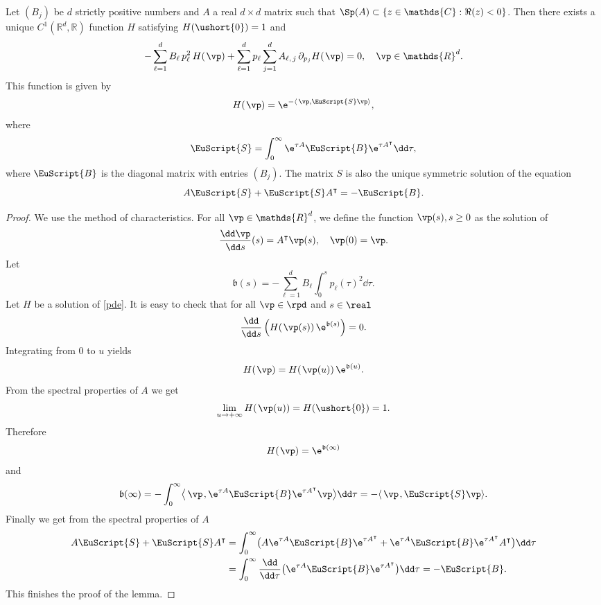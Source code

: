 \begin{lemma}\label{uniquesol}
Let $(B_{j})$ be $d$ strictly positive numbers and $A$ a real $d\times
d$ matrix
such that $\Sp(A)\subset\{z\in\mathds{C}: \Re(z)<0\}$. Then
there exists a unique $C^{1}(\mathds{R}^d,\mathds{R})$ function $H$ satisfying
$H(\ushort{0})=1$ and
\begin{equation}
\label{pde}
-\sum_{\ell=1}^{d}B_{\ell}\, p_{\ell}^2\,H(\hspace{1pt}\vp)+\sum_{\ell=1}^{d} p_{\ell}\sum_{j=1}^{d}A_{\ell,\,j}\,\partial_{p_{j}}H(\hspace{1pt}\vp)=0,\quad \vp\in \mathds{R}^d.
\end{equation}
This function is given by
\[
H(\hspace{1pt}\vp)=\e^{-\langle\, \vp,\EuScript{S}\vp \rangle},
\]
where
\[
\EuScript{S}=\int_{0}^{\infty}\e^{\tau A}\EuScript{B}\e^{\tau A^{\intercal}}\dd\tau,
\]
where $\EuScript{B}$ is the diagonal matrix with entries $(B_{j})$.
The matrix $S$ is also the unique symmetric solution of the
equation
\[
A \EuScript{S}+\EuScript{S} A^{\intercal}=-\EuScript{B}.
\]
\end{lemma}
\begin{proof} We use the method of characteristics. For all $\vp\in \mathds{R}^d$, we define the function
$\vp(s), s\geq 0$ as the solution of
\[
\frac{\dd\vp}{\dd s}(s)= A^{\intercal}\vp(s),\quad\vp(0)=\vp.
\]
Let
\[
\mathfrak{b}(s)=-\sum_{\ell=1}^d B_{\ell} \int_{0}^{s} p_{\ell}(\tau)^2\dd\tau.
\]
Let $H$ be a solution of \eqref{pde}. It is easy to check that for all $\vp\in\rpd$ and $s\in\real$
\[
\frac{\dd}{\dd s}\left(H\!\left(\hspace{1pt}\vp(s)\right)\e^{\mathfrak{b}(s)}\right)=0.
\]
Integrating from $0$ to $u$ yields
\[
H(\hspace{1pt}\vp)=H\!\left(\hspace{1pt}\vp(u)\right) \e^{\mathfrak{b}(u)}.
\]
From the spectral properties of $A$ we get
\[
\lim_{u\to+\infty}H\!\left(\hspace{1pt}\vp(u)\right) =H(\ushort{0})=1.
\]
Therefore
\[
H(\hspace{1pt}\vp)=\e^{\mathfrak{b}(\infty)}
\]
and
\[
\mathfrak{b}(\infty)=-\int_{0}^{\infty}\bigl\langle\,\vp\hspace{1pt},\e^{\tau A}\EuScript{B}\e^{\tau A^{\intercal}}\vp\bigr\rangle\dd\tau
=-\langle\, \vp\hspace{1pt},\EuScript{S}\vp\rangle.
\]
Finally we get from the spectral properties of $A$
\begin{align*}
A \EuScript{S}+\EuScript{S} A^{\intercal}
&= \int_{0}^{\infty} \bigl(A\e^{\tau A}\EuScript{B}\e^{\tau A^{\intercal}}+\e^{\tau A}\EuScript{B}\e^{\tau A^{\intercal}} A^{\intercal} \bigr)
\dd\tau\\
&= \int_{0}^{\infty}\frac{\dd}{\dd\tau} \bigl(\e^{\tau A}\EuScript{B}\e^{\tau A^{\intercal}} \bigr)\dd\tau
=-\EuScript{B}.
\end{align*}
This finishes the proof of the lemma.
\end{proof}

